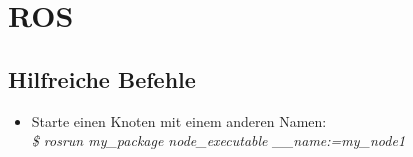 \chapter{ROS}


\section{Hilfreiche Befehle}

\begin{itemize}
\item Starte einen Knoten mit einem anderen Namen: \\
\textit{\$ rosrun my\_package node\_executable \_\_name:=my\_node1}
\end{itemize}